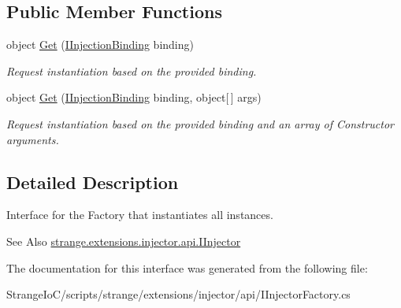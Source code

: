 \subsection*{Public Member Functions}
\begin{DoxyCompactItemize}
\item 
\hypertarget{interfacestrange_1_1extensions_1_1injector_1_1api_1_1_i_injector_factory_acbb92c191690effea5d246427c71dd3c}{object \hyperlink{interfacestrange_1_1extensions_1_1injector_1_1api_1_1_i_injector_factory_acbb92c191690effea5d246427c71dd3c}{Get} (\hyperlink{interfacestrange_1_1extensions_1_1injector_1_1api_1_1_i_injection_binding}{I\-Injection\-Binding} binding)}\label{interfacestrange_1_1extensions_1_1injector_1_1api_1_1_i_injector_factory_acbb92c191690effea5d246427c71dd3c}

\begin{DoxyCompactList}\small\item\em Request instantiation based on the provided binding. \end{DoxyCompactList}\item 
\hypertarget{interfacestrange_1_1extensions_1_1injector_1_1api_1_1_i_injector_factory_ad0248c64a58e2d9a9b192fedf12f62d4}{object \hyperlink{interfacestrange_1_1extensions_1_1injector_1_1api_1_1_i_injector_factory_ad0248c64a58e2d9a9b192fedf12f62d4}{Get} (\hyperlink{interfacestrange_1_1extensions_1_1injector_1_1api_1_1_i_injection_binding}{I\-Injection\-Binding} binding, object\mbox{[}$\,$\mbox{]} args)}\label{interfacestrange_1_1extensions_1_1injector_1_1api_1_1_i_injector_factory_ad0248c64a58e2d9a9b192fedf12f62d4}

\begin{DoxyCompactList}\small\item\em Request instantiation based on the provided binding and an array of Constructor arguments. \end{DoxyCompactList}\end{DoxyCompactItemize}


\subsection{Detailed Description}
Interface for the Factory that instantiates all instances. 

\begin{DoxySeeAlso}{See Also}
\hyperlink{interfacestrange_1_1extensions_1_1injector_1_1api_1_1_i_injector}{strange.\-extensions.\-injector.\-api.\-I\-Injector} 
\end{DoxySeeAlso}


The documentation for this interface was generated from the following file\-:\begin{DoxyCompactItemize}
\item 
Strange\-Io\-C/scripts/strange/extensions/injector/api/I\-Injector\-Factory.\-cs\end{DoxyCompactItemize}
